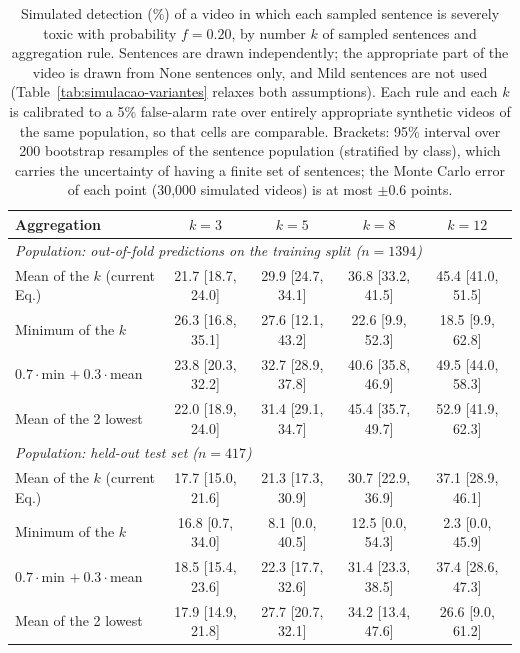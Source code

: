 \begin{table}[!t]
\centering
\caption{Simulated detection (\%) of a video in which each sampled sentence is severely toxic with probability $f = 0.20$, by number $k$ of sampled sentences and aggregation rule. Sentences are drawn independently; the appropriate part of the video is drawn from None sentences only, and Mild sentences are not used (Table~\ref{tab:simulacao-variantes} relaxes both assumptions). Each rule and each $k$ is calibrated to a 5\% false-alarm rate over entirely appropriate synthetic videos of the same population, so that cells are comparable. Brackets: 95\% interval over 200 bootstrap resamples of the sentence population (stratified by class), which carries the uncertainty of having a finite set of sentences; the Monte Carlo error of each point (30,000 simulated videos) is at most $\pm$0.6 points.}
\label{tab:simulacao}
\begin{tabular}{lcccc}
\toprule
Aggregation & $k=3$ & $k=5$ & $k=8$ & $k=12$ \\
\midrule
\multicolumn{5}{l}{\emph{Population: out-of-fold predictions on the training split ($n = 1394$)}} \\
Mean of the $k$ (current Eq.) & 21.7 [18.7, 24.0] & 29.9 [24.7, 34.1] & 36.8 [33.2, 41.5] & 45.4 [41.0, 51.5] \\
Minimum of the $k$ & 26.3 [16.8, 35.1] & 27.6 [12.1, 43.2] & 22.6 [9.9, 52.3] & 18.5 [9.9, 62.8] \\
$0.7\cdot$min $+\ 0.3\cdot$mean & 23.8 [20.3, 32.2] & 32.7 [28.9, 37.8] & 40.6 [35.8, 46.9] & 49.5 [44.0, 58.3] \\
Mean of the 2 lowest & 22.0 [18.9, 24.0] & 31.4 [29.1, 34.7] & 45.4 [35.7, 49.7] & 52.9 [41.9, 62.3] \\
\midrule
\multicolumn{5}{l}{\emph{Population: held-out test set ($n = 417$)}} \\
Mean of the $k$ (current Eq.) & 17.7 [15.0, 21.6] & 21.3 [17.3, 30.9] & 30.7 [22.9, 36.9] & 37.1 [28.9, 46.1] \\
Minimum of the $k$ & 16.8 [0.7, 34.0] & 8.1 [0.0, 40.5] & 12.5 [0.0, 54.3] & 2.3 [0.0, 45.9] \\
$0.7\cdot$min $+\ 0.3\cdot$mean & 18.5 [15.4, 23.6] & 22.3 [17.7, 32.6] & 31.4 [23.3, 38.5] & 37.4 [28.6, 47.3] \\
Mean of the 2 lowest & 17.9 [14.9, 21.8] & 27.7 [20.7, 32.1] & 34.2 [13.4, 47.6] & 26.6 [9.0, 61.2] \\
\bottomrule
\end{tabular}
\end{table}

